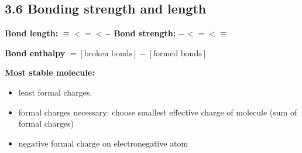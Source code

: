 \subsection{3.6 Bonding strength and length}
    \textbf{Bond length:} $\equiv < = < -$ \qquad \textbf{Bond strength:} $- < = < \equiv$
    \vspace*{0.5em}

    \textbf{Bond enthalpy} $= [\textrm{broken bonds}] - [\textrm{formed bonds}]$
    \vspace*{0.5em}

    \textbf{Most stable molecule:}
    \vspace*{-0.5em}
    \begin{itemize}
        \itemsep0em
        \item least formal charges.
        \item formal charges necessary: choose smallest effective charge of molecule (sum of formal charges)
        \item negative formal charge on electronegative atom
    \end{itemize}